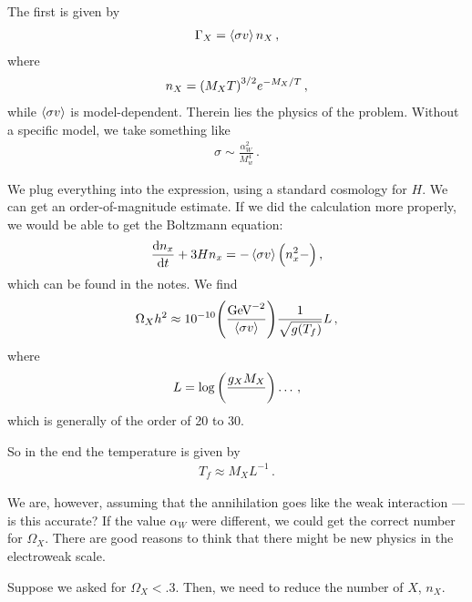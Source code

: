 \documentclass[main.tex]{subfiles}
\begin{document}
The first is given by 
%
\begin{align}
\Gamma_{X} = \expval{\sigma v} n_X 
\,,
\end{align}
%
where 
%
\begin{align}
n_X = \qty(M_X T )^{3/2} e^{-M_X / T}
\,,
\end{align}
%
while \(\expval{\sigma v}\) is model-dependent. Therein lies the physics of the problem.
Without a specific model, we take something like 
%
\begin{align}
\sigma \sim \frac{\alpha_{W}^2}{M_w^{4}} 
\,.
\end{align}

We plug everything into the expression, using a standard cosmology for \(H\). 
We can get an order-of-magnitude estimate. 
If we did the calculation more properly, we would be able to get the Boltzmann equation: 
%
\begin{align}
\dv{n_x}{t} + 3 H n_x = - \expval{\sigma v} \qty(n_x^2 -)
\,,
\end{align}
%
which can be found in the notes. 
We find 
%
\begin{align}
\Omega_{X} h^2 \approx \num{e-10} \qty(\frac{\SI{}{GeV^{-2}}}{\expval{\sigma v}}) \frac{1}{\sqrt{g(T_f)}} L
\,,
\end{align}
%
where 
%
\begin{align}
L = \log \qty(\frac{g_X M_X }{}) \dots
\,,
\end{align}
%
which is generally of the order of \num{20} to \num{30}.

So in the end the temperature is given by 
%
\begin{align}
T_f \approx M_X L^{-1}
\,.
\end{align}

We are, however, assuming that the annihilation goes like the weak interaction --- is this accurate?
If the value \(\alpha_{W} \) were different, we could get the correct number for \(\Omega_{X}\). 
There are good reasons to think that there might be new physics in the electroweak scale. 


Suppose we asked for \(\Omega_{X} < \num{.3}\). Then, we need to reduce the number of \(X\), \(n_X\). 

\end{document}

